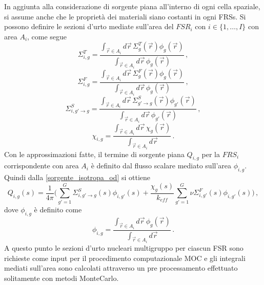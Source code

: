In aggiunta alla considerazione di sorgente piana all'interno di ogni cella 
spaziale, si assume anche che le proprietà dei materiali siano costanti in ogni 
FRSs. Si possono definire le sezioni d'urto mediate sull'area del $FSR_i$ con $i 
\in \{1,\dots,I\}$ con area $A_i$, come segue
\begin{equation}
\Sigma_{i,g}^T= \frac{\int_{\vec{r}\in A_i} d\vec{r}\, 
\Sigma_g^T(\vec{r})\phi_g(\vec{r})}{\int_{\vec{r}\in A_i}d\vec{r}\, 
\phi_g(\vec{r})} \,,
\end{equation}
\begin{equation}
\Sigma_{i,g}^F= \frac{\int_{\vec{r}\in A_i} d\vec{r}\, 
\Sigma_g^F(\vec{r})\phi_g(\vec{r})}{\int_{\vec{r}\in A_i}d\vec{r}\, 
\phi_g(\vec{r})} \,,
\end{equation}
\begin{equation}
\Sigma_{i,g'\rightarrow g}^S= \frac{\int_{\vec{r}\in A_i} d\vec{r}\, 
\Sigma_{g'\rightarrow g}^S(\vec{r})\phi_{g'}(\vec{r})}{\int_{\vec{r}\in A_i} 
d\vec{r}\, \phi_{g'}(\vec{r})} \,,
\end{equation}
\begin{equation}
\chi_{i,g}= \frac{\int_{\vec{r}\in A_i} d\vec{r}\, 
\chi_g(\vec{r})}{\int_{\vec{r}\in A_i}d\vec{r}} \,.
\end{equation}
Con le approssimazioni fatte, il termine di sorgente piana $Q_{i,g}$ per la 
$FRS_i$ corrispondente con area $A_i$ è definito dal flusso scalare mediato 
sull'area $\phi_{i,g}$. Quindi dalla \eqref{sorgente_isotropa_od} si ottiene
\begin{equation}
Q_{i,g}(s)=\frac{1}{4\pi}\biggl(\sum_{g'=1}^G \Sigma_{i,g'\rightarrow 
g}^S(s)\phi_{i,g'}(s)+\frac{\chi_g(s)}{k_{eff}}\sum_{g'=1}^G\nu 
\Sigma_{i,g'}^F(s)\phi_{i,g'}(s)\biggr) \,,
\end{equation}
dove $\phi_{i,g}$ è definito come
\begin{equation}
\label{flusso_scalare_FSR}
\phi_{i,g}=\frac{\int_{\vec{r}\in A_i} d\vec{r}\, 
\phi_g(\vec{r})}{\int_{\vec{r}\in A_i} d\vec{r}} \,.
\end{equation}
A questo punto le sezioni d'urto nucleari multigruppo per ciascun FSR sono 
richieste come input per il procedimento computazionale MOC e gli integrali 
mediati sull'area sono calcolati attraverso un pre processamento effettuato 
solitamente con metodi MonteCarlo.

